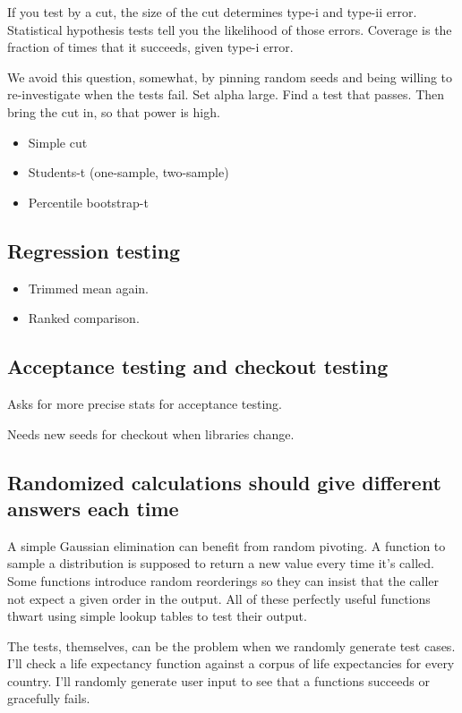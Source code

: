 \documentclass[fleqn,10pt]{olplainarticle}
\begin{document}
If you test by a cut, the size of the cut determines type-i and type-ii error.
Statistical hypothesis tests tell you the likelihood of those errors.
Coverage is the fraction of times that it succeeds, given type-i error.

We avoid this question, somewhat, by pinning random seeds and being
willing to re-investigate when the tests fail.
Set alpha large. Find a test that passes. Then bring the cut in,
so that power is high.

\begin{itemize}
    \item Simple cut
    \item Students-t (one-sample, two-sample)
    \item Percentile bootstrap-t
\end{itemize}


\subsection{Regression testing}

\begin{itemize}
    \item Trimmed mean again.
    \item Ranked comparison.
\end{itemize}


\subsection{Acceptance testing and checkout testing}

Asks for more precise stats for acceptance testing.

Needs new seeds for checkout when libraries change.


\subsection{Randomized calculations should give different answers each time}

A simple Gaussian elimination can benefit from random pivoting.
A function to sample a distribution is supposed to return a new value
every time it's called.
Some functions introduce random reorderings
so they can insist that the caller not expect a given order
in the output. All of these perfectly useful functions
thwart using simple lookup tables to test their output.

The tests, themselves, can be the problem when we randomly
generate test cases. I'll check
a life expectancy function against a corpus of life expectancies
for every country. I'll randomly generate user input
to see that a functions succeeds or gracefully fails.
\end{document}
